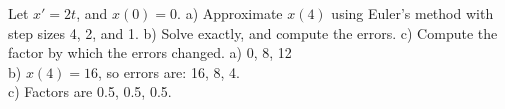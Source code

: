 {Let $x' = 2t$, and $x(0)=0$.
a) Approximate $x(4)$ using Euler's method with step sizes 4, 2, and 1.
b) Solve exactly, and compute the errors.
c) Compute the factor by which the errors changed.}
{
a) 0, 8, 12
\\
b) $x(4) = 16$, so errors are: 16, 8, 4.
\\
c) Factors are 0.5, 0.5, 0.5.}